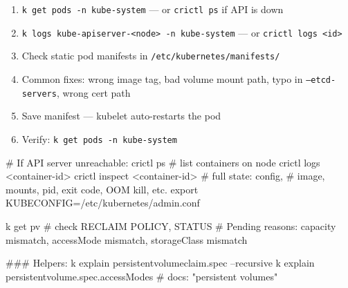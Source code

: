 \begin{tcbitemize}[
  raster columns=3, raster equal height=rows,
  blanker, cheat subtitle
]
\begin{tcbitemize}[
      raster columns=1, raster equal height=rows,
      blanker, cheat subtitle
    ]
      \tcbitem
        {\fontsize{6.5}{7.5}\selectfont\sffamily
        \begin{enumerate}[leftmargin=1.2em, itemsep=0pt, parsep=0pt, topsep=1pt]
          \item \texttt{k get pods -n kube-system} — or \texttt{crictl ps} if API is down
          \item \texttt{k logs kube-apiserver-<node> -n kube-system} — or \texttt{crictl logs <id>}
          \item Check static pod manifests in \texttt{/etc/kubernetes/manifests/}
          \item Common fixes: wrong image tag, bad volume mount path, typo in \texttt{--etcd-servers}, wrong cert path
          \item Save manifest — kubelet auto-restarts the pod
          \item Verify: \texttt{k get pods -n kube-system}
        \end{enumerate}}
        \begin{cheatcodebash}
# If API server unreachable:
crictl ps                   # list containers on node
crictl logs <container-id>
crictl inspect <container-id> # full state: config,
# image, mounts, pid, exit code, OOM kill, etc.
export KUBECONFIG=/etc/kubernetes/admin.conf
        \end{cheatcodebash}

      \tcbitem
        \begin{cheatcodebash}
        k get pv    # check RECLAIM POLICY, STATUS
        # Pending reasons: capacity mismatch, accessMode mismatch, storageClass mismatch
        \end{cheatcodebash}
        \begin{cheatcodebash}
        ### Helpers:
        k explain persistentvolumeclaim.spec --recursive
        k explain persistentvolume.spec.accessModes
        # docs: "persistent volumes"
        \end{cheatcodebash}

    \end{tcbitemize}

  \tcbitem
    \begin{tcbitemize}[
      raster columns=1, raster equal height=rows,
      blanker, cheat subtitle
    ]


\end{tcbitemize}
\end{tcbitemize}
